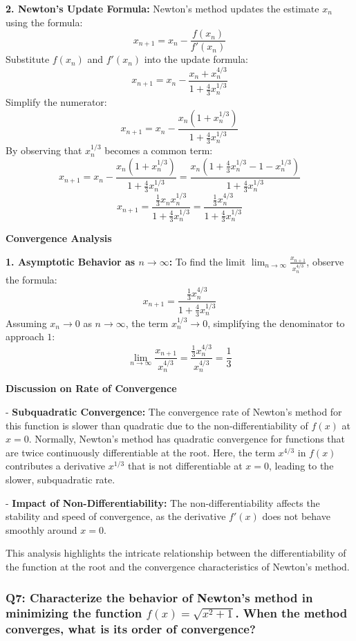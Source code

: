 \documentclass{article}
\begin{document}
\textbf{2. Newton's Update Formula:}
   Newton's method updates the estimate \(x_n\) using the formula:
   \[
   x_{n+1} = x_n - \frac{f(x_n)}{f'(x_n)}
   \]
   Substitute \(f(x_n)\) and \(f'(x_n)\) into the update formula:
   \[
   x_{n+1} = x_n - \frac{x_n + x_n^{4/3}}{1 + \frac{4}{3} x_n^{1/3}}
   \]
   Simplify the numerator:
   \[
   x_{n+1} = x_n - \frac{x_n(1 + x_n^{1/3})}{1 + \frac{4}{3} x_n^{1/3}}
   \]
   By observing that \(x_n^{1/3}\) becomes a common term:
   \[
   x_{n+1} = x_n - \frac{x_n(1 + x_n^{1/3})}{1 + \frac{4}{3} x_n^{1/3}} = \frac{x_n \left(1 + \frac{4}{3}x_n^{1/3} - 1 - x_n^{1/3}\right)}{1 + \frac{4}{3} x_n^{1/3}}
   \]
   \[
   x_{n+1} = \frac{\frac{1}{3} x_n x_n^{1/3}}{1 + \frac{4}{3} x_n^{1/3}} = \frac{\frac{1}{3} x_n^{4/3}}{1 + \frac{4}{3} x_n^{1/3}}
   \]

\textbf{Convergence Analysis}

\textbf{1. Asymptotic Behavior as \(n \to \infty\):}
   To find the limit \(\lim_{n \to \infty} \frac{x_{n+1}}{x_n^{4/3}}\), observe the formula:
   \[
   x_{n+1} = \frac{\frac{1}{3} x_n^{4/3}}{1 + \frac{4}{3} x_n^{1/3}}
   \]
   Assuming \(x_n \to 0\) as \(n \to \infty\), the term \(x_n^{1/3} \to 0\), simplifying the denominator to approach \(1\):
   \[
   \lim_{n \to \infty} \frac{x_{n+1}}{x_n^{4/3}} = \frac{\frac{1}{3} x_n^{4/3}}{x_n^{4/3}} = \frac{1}{3}
   \]

\textbf{Discussion on Rate of Convergence}

- \textbf{Subquadratic Convergence:} The convergence rate of Newton's method for this function is slower than quadratic due to the non-differentiability of \(f(x)\) at \(x = 0\). Normally, Newton's method has quadratic convergence for functions that are twice continuously differentiable at the root. Here, the term \(x^{4/3}\) in \(f(x)\) contributes a derivative \(x^{1/3}\) that is not differentiable at \(x = 0\), leading to the slower, subquadratic rate.

- \textbf{Impact of Non-Differentiability:} The non-differentiability affects the stability and speed of convergence, as the derivative \(f'(x)\) does not behave smoothly around \(x = 0\).

This analysis highlights the intricate relationship between the differentiability of the function at the root and the convergence characteristics of Newton's method.

\subsubsection*{Q7: Characterize the behavior of Newton’s method in minimizing the function \(f(x) = \sqrt{x^2 + 1}\). When the method converges, what is its order of convergence?}
\end{document}
